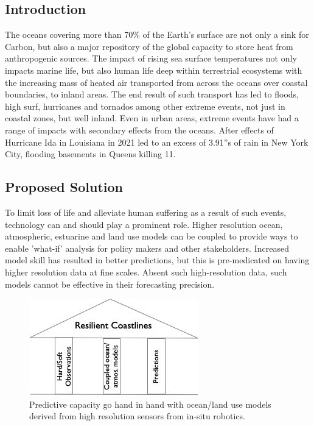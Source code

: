 \subsection*{Introduction}

The oceans covering more than 70\% of the Earth's surface are not only
a sink for Carbon, but also a major repository of the global capacity
to store heat from anthropogenic sources. The impact of rising sea
surface temperatures not only impacts marine life, but also human life
deep within terrestrial ecosystems with the increasing mass of heated
air transported from across the oceans over coastal boundaries, to
inland areas. The end result of such transport has led to floods, high
surf, hurricanes and tornados among other extreme events, not just in
coastal zones, but well inland. Even in urban areas, extreme events
have had a range of impacts with secondary effects from the
oceans. After effects of Hurricane Ida in Louisiana in 2021 led to an
excess of 3.91''s of rain in New York City, flooding basements in
Queens killing 11.

\subsection*{Proposed Solution}

To limit loss of life and alleviate human suffering as a result of
such events, technology can and should play a prominent role. Higher
resolution ocean, atmospheric, estuarine and land use models can be
coupled to provide ways to enable 'what-if' analysis for policy makers
and other stakeholders. Increased model skill has resulted in better
predictions, but this is pre-medicated on having higher resolution
data at fine scales. Absent such high-resolution data, such models
cannot be effective in their forecasting precision. 

\begin{figure}
  \centering
  \includegraphics[scale=0.5]{fig/trioka.jpg}
  \caption{Predictive capacity go hand in hand with ocean/land use
    models derived from high resolution sensors from in-situ robotics.}
  \label{fig:tri}
\end{figure}


